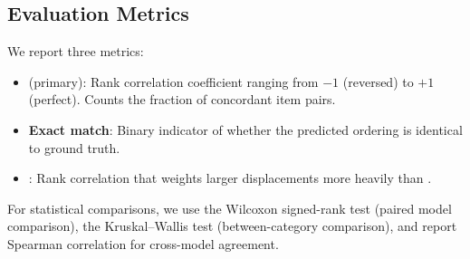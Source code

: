 \subsection{Evaluation Metrics}
\label{sec:metrics}

We report three metrics:
\begin{itemize}[leftmargin=*,itemsep=0pt,topsep=0pt]
    \item \textbf{\kendalltau} (primary): Rank correlation coefficient ranging from $-1$ (reversed) to $+1$ (perfect). Counts the fraction of concordant item pairs.
    \item \textbf{Exact match}: Binary indicator of whether the predicted ordering is identical to ground truth.
    \item \textbf{\spearmanrho}: Rank correlation that weights larger displacements more heavily than \kendalltau.
\end{itemize}

For statistical comparisons, we use the Wilcoxon signed-rank test (paired model comparison), the Kruskal--Wallis test (between-category comparison), and report Spearman correlation for cross-model agreement.
